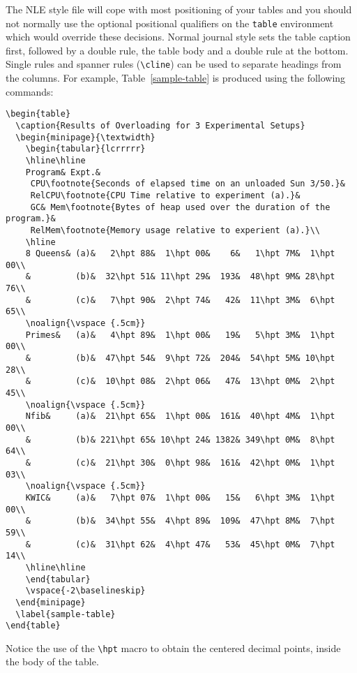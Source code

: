 \documentclass{cnle}
\begin{document}
The NLE style file will cope with most positioning of your tables
and you should not normally use the optional positional qualifiers on the
\verb"table" environment which would override these decisions.
Normal journal style sets the table caption first, followed by a double
rule, the table body and a double rule at the bottom.  Single rules and
spanner rules (\verb"\cline") can be used to separate headings from the
columns.  For example, Table~\ref{sample-table} is produced using the
following commands:\par
%
{\small
\begin{verbatim}
\begin{table}
  \caption{Results of Overloading for 3 Experimental Setups}
  \begin{minipage}{\textwidth}
    \begin{tabular}{lcrrrrr}
    \hline\hline
    Program& Expt.&
     CPU\footnote{Seconds of elapsed time on an unloaded Sun 3/50.}&
     RelCPU\footnote{CPU Time relative to experiment (a).}&
     GC& Mem\footnote{Bytes of heap used over the duration of the program.}&
     RelMem\footnote{Memory usage relative to experient (a).}\\
    \hline
    8 Queens& (a)&   2\hpt 88&  1\hpt 00&    6&   1\hpt 7M&  1\hpt 00\\
    &         (b)&  32\hpt 51& 11\hpt 29&  193&  48\hpt 9M& 28\hpt 76\\
    &         (c)&   7\hpt 90&  2\hpt 74&   42&  11\hpt 3M&  6\hpt 65\\
    \noalign{\vspace {.5cm}}
    Primes&   (a)&   4\hpt 89&  1\hpt 00&   19&   5\hpt 3M&  1\hpt 00\\
    &         (b)&  47\hpt 54&  9\hpt 72&  204&  54\hpt 5M& 10\hpt 28\\
    &         (c)&  10\hpt 08&  2\hpt 06&   47&  13\hpt 0M&  2\hpt 45\\
    \noalign{\vspace {.5cm}}
    Nfib&     (a)&  21\hpt 65&  1\hpt 00&  161&  40\hpt 4M&  1\hpt 00\\
    &         (b)& 221\hpt 65& 10\hpt 24& 1382& 349\hpt 0M&  8\hpt 64\\
    &         (c)&  21\hpt 30&  0\hpt 98&  161&  42\hpt 0M&  1\hpt 03\\
    \noalign{\vspace {.5cm}}
    KWIC&     (a)&   7\hpt 07&  1\hpt 00&   15&   6\hpt 3M&  1\hpt 00\\
    &         (b)&  34\hpt 55&  4\hpt 89&  109&  47\hpt 8M&  7\hpt 59\\
    &         (c)&  31\hpt 62&  4\hpt 47&   53&  45\hpt 0M&  7\hpt 14\\
    \hline\hline
    \end{tabular}
    \vspace{-2\baselineskip}
  \end{minipage}
  \label{sample-table}
\end{table}
\end{verbatim}}
%
\noindent Notice the use of the \verb"\hpt" macro to obtain the centered
decimal points, inside the body of the table.
\end{document}
